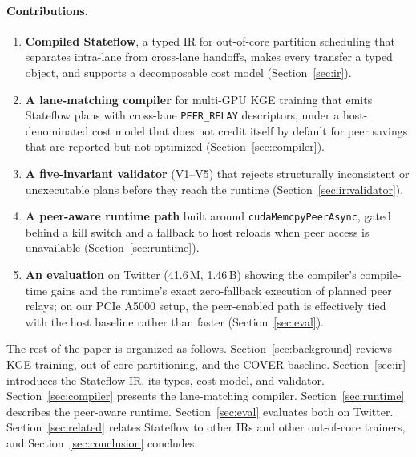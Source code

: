 \paragraph{Contributions.}
\begin{enumerate}
\item \textbf{Compiled Stateflow}, a typed IR for out-of-core
partition scheduling that separates intra-lane from cross-lane
handoffs, makes every transfer a typed object, and supports a
decomposable cost model (Section~\ref{sec:ir}).
\item \textbf{A lane-matching compiler} for multi-GPU KGE training
that emits Stateflow plans with cross-lane \texttt{PEER\_RELAY}
descriptors, under a host-denominated cost model that does not
credit itself by default for peer savings that are reported but not
optimized
(Section~\ref{sec:compiler}).
\item \textbf{A five-invariant validator} (V1--V5) that rejects
structurally inconsistent or unexecutable plans before they reach
the runtime (Section~\ref{sec:ir:validator}).
\item \textbf{A peer-aware runtime path} built around
\texttt{cudaMemcpyPeerAsync}, gated behind a kill switch and a
fallback to host reloads when peer access is unavailable
(Section~\ref{sec:runtime}).
\item \textbf{An evaluation} on Twitter (41.6\,M, 1.46\,B) showing
the compiler's compile-time gains and the runtime's exact zero-fallback
execution of planned peer relays; on our PCIe A5000 setup, the
peer-enabled path is effectively tied with the host baseline rather
than faster (Section~\ref{sec:eval}).
\end{enumerate}

The rest of the paper is organized as follows.
Section~\ref{sec:background} reviews KGE training, out-of-core
partitioning, and the COVER baseline.
Section~\ref{sec:ir} introduces the Stateflow IR, its types, cost
model, and validator.
Section~\ref{sec:compiler} presents the lane-matching compiler.
Section~\ref{sec:runtime} describes the peer-aware runtime.
Section~\ref{sec:eval} evaluates both on Twitter.
Section~\ref{sec:related} relates Stateflow to other IRs and other
out-of-core trainers, and Section~\ref{sec:conclusion} concludes.
